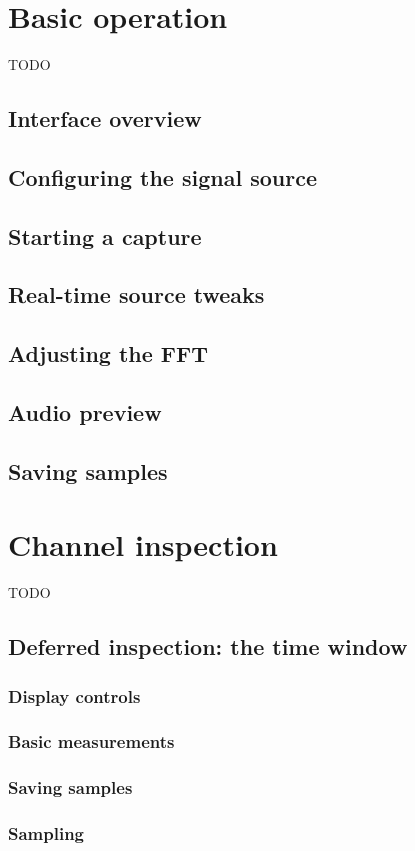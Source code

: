\documentclass{ol-softwaremanual}
\begin{document}
\chapter{Basic operation}
TODO
\section{Interface overview}
\section{Configuring the signal source}
\section{Starting a capture}
\section{Real-time source tweaks}
\section{Adjusting the FFT}
\section{Audio preview}
\section{Saving samples}

\chapter{Channel inspection}
TODO
\section{Deferred inspection: the time window}
\subsection{Display controls}
\subsection{Basic measurements}
\subsection{Saving samples}
\subsection{Sampling}
\end{document}
